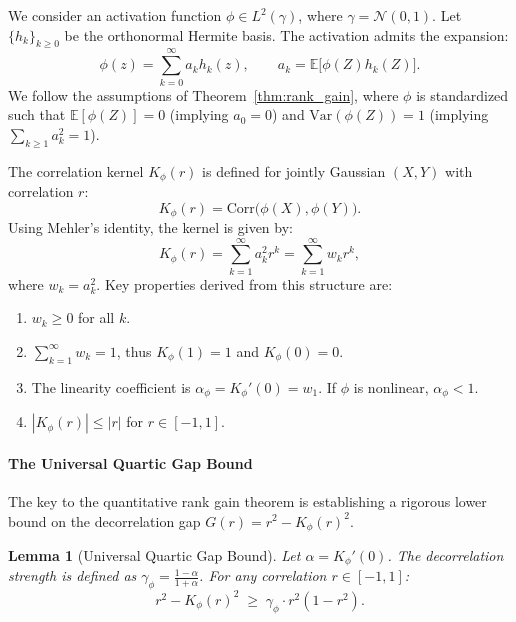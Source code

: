 \documentclass{article}
\newtheorem{lemma}{Lemma}[section]
\numberwithin{figure}{section}
\begin{document}
We consider an activation function $\phi \in L^2(\gamma)$, where $\gamma=\mathcal{N}(0,1)$. Let $\{h_k\}_{k\ge 0}$ be the orthonormal Hermite basis. The activation admits the expansion:
\[
\phi(z)=\sum_{k=0}^\infty a_k h_k(z), \qquad a_k=\mathbb{E}\big[\phi(Z)h_k(Z)\big].
\]
We follow the assumptions of Theorem~\ref{thm:rank_gain}, where $\phi$ is standardized such that $\mathbb{E}[\phi(Z)]=0$ (implying $a_0=0$) and $\mathrm{Var}(\phi(Z))=1$ (implying $\sum_{k \ge 1} a_k^2 = 1$).

The correlation kernel $K_\phi(r)$ is defined for jointly Gaussian $(X,Y)$ with correlation $r$:
\[
K_\phi(r) = \mathrm{Corr}\big(\phi(X),\phi(Y)\big).
\]
Using Mehler's identity, the kernel is given by:
\begin{equation}
\label{eq:Kphi_series_appendix}
K_\phi(r) = \sum_{k=1}^\infty a_k^2 r^k = \sum_{k=1}^\infty w_k r^k,
\end{equation}
where $w_k = a_k^2$. Key properties derived from this structure are:
\begin{enumerate}
    \item $w_k \ge 0$ for all $k$.
    \item $\sum_{k=1}^\infty w_k = 1$, thus $K_\phi(1)=1$ and $K_\phi(0)=0$.
    \item The linearity coefficient is $\alpha_\phi = K_\phi'(0) = w_1$. If $\phi$ is nonlinear, $\alpha_\phi < 1$.
    \item $|K_\phi(r)| \le |r|$ for $r \in [-1, 1]$.
\end{enumerate}

\paragraph{The Universal Quartic Gap Bound}

The key to the quantitative rank gain theorem is establishing a rigorous lower bound on the decorrelation gap $G(r) = r^2 - K_\phi(r)^2$.

\begin{lemma}[Universal Quartic Gap Bound]
\label{lem:quartic_bound}
Let $\alpha = K_\phi'(0)$. The decorrelation strength is defined as $\gamma_\phi = \frac{1-\alpha}{1+\alpha}$. For any correlation $r \in [-1, 1]$:
\begin{equation}
    r^2 - K_\phi(r)^2 \;\ge\; \gamma_\phi \cdot r^2(1-r^2).
\end{equation}
\end{lemma}
\end{document}
